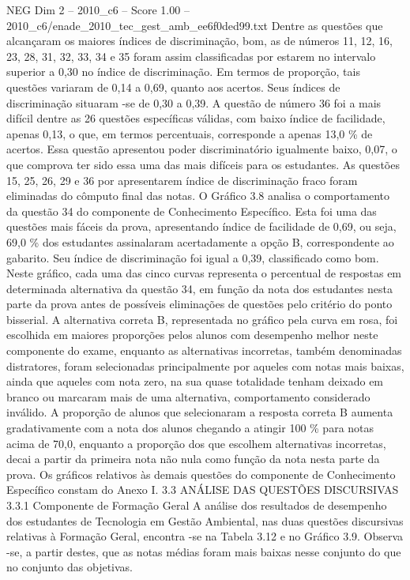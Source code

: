 \begin{textsample}{NEG Dim 2 – 2010\_c6 – Score 1.00 – 2010\_c6/enade\_2010\_tec\_gest\_amb\_ee6f0ded99.txt}
Dentre as questões que alcançaram os maiores índices de discriminação, bom, as de números 11, 12, 16, 23, 28, 31, 32, 33, 34 e 35 foram assim classificadas por estarem no intervalo superior a 0,30 no índice de discriminação.
Em termos de proporção, tais questões variaram de 0,14 a 0,69, quanto aos acertos.
Seus índices de discriminação situaram -se de 0,30 a 0,39.
A questão de número 36 foi a mais difícil dentre as 26 questões específicas válidas, com baixo índice de facilidade, apenas 0,13, o que, em termos percentuais, corresponde a apenas 13,0 \% de acertos.
Essa questão apresentou poder discriminatório igualmente baixo, 0,07, o que comprova ter sido essa uma das mais difíceis para os estudantes.
As questões 15, 25, 26, 29 e 36 por apresentarem índice de discriminação fraco foram eliminadas do cômputo final das notas.
O Gráfico 3.8 analisa o comportamento da questão 34 do componente de Conhecimento Específico.
Esta foi uma das questões mais fáceis da prova, apresentando índice de facilidade de 0,69, ou seja, 69,0 \% dos estudantes assinalaram acertadamente a opção B, correspondente ao gabarito.
Seu índice de discriminação foi igual a 0,39, classificado como bom.
Neste gráfico, cada uma das cinco curvas representa o percentual de respostas em determinada alternativa da questão 34, em função da nota dos estudantes nesta parte da prova antes de possíveis eliminações de questões pelo critério do ponto bisserial.
A alternativa correta B, representada no gráfico pela curva em rosa, foi escolhida em maiores proporções pelos alunos com desempenho melhor neste componente do exame, enquanto as alternativas incorretas, também denominadas distratores, foram selecionadas principalmente por aqueles com notas mais baixas, ainda que aqueles com nota zero, na sua quase totalidade tenham deixado em branco ou marcaram mais de uma alternativa, comportamento considerado inválido.
A proporção de alunos que selecionaram a resposta correta B aumenta gradativamente com a nota dos alunos chegando a atingir 100 \% para notas acima de 70,0, enquanto a proporção dos que escolhem alternativas incorretas, decai a partir da primeira nota não nula como função da nota nesta parte da prova.
Os gráficos relativos às demais questões do componente de Conhecimento Específico constam do Anexo I. 3.3 ANÁLISE DAS QUESTÕES DISCURSIVAS 3.3.1 Componente de Formação Geral A análise dos resultados de desempenho dos estudantes de Tecnologia em Gestão Ambiental, nas duas questões discursivas relativas à Formação Geral, encontra -se na Tabela 3.12 e no Gráfico 3.9.
Observa -se, a partir destes, que as notas médias foram mais baixas nesse conjunto do que no conjunto das objetivas.

\end{textsample}

